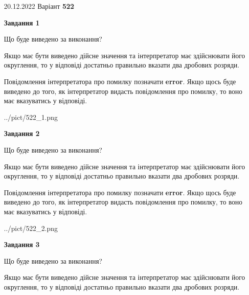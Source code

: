 \documentclass[12pt, ukrainian]{article}
\begin{document}
{20.12.2022 Варіант \No \textbf { 522 }\par}
{
\begin {Large}

{\begin {center}\textbf{Завдання 1}\end {center}}\par
Що буде виведено за виконання? \par

Якщо має бути виведено дійсне значення та інтерпретатор має здійснювати його округлення, 
то у відповіді достатньо правильно вказати два дробових розряди.

Повідомлення інтерпретатора про помилку позначати \textbf{error}.
Якщо щось буде виведено до того, як інтерпретатор видасть повідомлення про помилку, 
то воно має вказуватись у відповіді. \par

\begin{center}
	{../pict/522_1.png}
\end{center}
\newpage

{\begin {center}\textbf{Завдання 2}\end {center}}\par
Що буде виведено за виконання? \par

Якщо має бути виведено дійсне значення та інтерпретатор має здійснювати його округлення, 
то у відповіді достатньо правильно вказати два дробових розряди.

Повідомлення інтерпретатора про помилку позначати \textbf{error}.
Якщо щось буде виведено до того, як інтерпретатор видасть повідомлення про помилку, 
то воно має вказуватись у відповіді. \par

\begin{center}
	{../pict/522_2.png}
\end{center}
\newpage

{\begin {center}\textbf{Завдання 3}\end {center}}\par
Що буде виведено за виконання? \par

Якщо має бути виведено дійсне значення та інтерпретатор має здійснювати його округлення, 
то у відповіді достатньо правильно вказати два дробових розряди.


\end{Large}}
\end{document}
